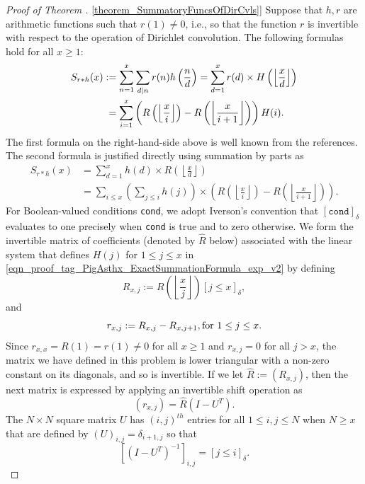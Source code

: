 \documentclass[11pt,reqno,a4letter]{article}
\newcommand{\hlocalref}[1]{\hyperref[#1]{\ref{#1}}}
\numberwithin{equation}{section}
\numberwithin{figure}{section}
\numberwithin{table}{section}
\newcommand{\Iverson}[1]{\ensuremath{\left[#1\right]_{\delta}}}
\newcommand{\floor}[1]{\left\lfloor #1 \right\rfloor}
\newcommand{\Floor}[2]{\ensuremath{\left\lfloor \frac{#1}{#2} \right\rfloor}}
\theoremstyle{plain}
\numberwithin{theorem}{section}
\theoremstyle{definition}
\theoremstyle{remark}
\newcommand{\mathtext}[1]{\text{\rm #1}}
\begin{document}
\begin{proof}[Proof of Theorem \hlocalref{theorem_SummatoryFuncsOfDirCvls}] 
\label{proofOf_theorem_SummatoryFuncsOfDirCvls} 
Suppose that $h,r$ are arithmetic functions such that $r(1) \neq 0$, i.e., so that 
the function $r$ is invertible with respect to the operation of Dirichlet convolution. 
The following formulas hold for all $x \geq 1$: 
\begin{align} 
\notag 
S_{r \ast h}(x) & := \sum_{n=1}^{x} \sum_{d|n} r(n) h\left(\frac{n}{d}\right) = 
     \sum_{d=1}^x r(d) \times H\left(\floor{\frac{x}{d}}\right) \\ 
\label{eqn_proof_tag_PigAsthx_ExactSummationFormula_exp_v2} 
     & \phantom{:} = 
     \sum_{i=1}^x \left(R\left(\floor{\frac{x}{i}}\right) - R\left(\floor{\frac{x}{i+1}}\right)\right) H(i). 
\end{align} 
The first formula on the right-hand-side above is well known from the references. 
The second formula is justified directly using 
summation by parts as \cite[\S 2.10(ii)]{NISTHB} 
\begin{align*} 
S_{r \ast h}(x) & = \sum_{d=1}^x h(d) \times R\left(\floor{\frac{x}{d}}\right) \\ 
     & = \sum_{i \leq x} \left(\sum_{j \leq i} h(j)\right) \times 
     \left(R\left(\floor{\frac{x}{i}}\right) - 
     R\left(\floor{\frac{x}{i+1}}\right)\right). 
\end{align*} 
For Boolean-valued conditions \texttt{cond}, we adopt Iverson's convention that 
$\Iverson{\mathtt{cond}}$ evaluates to one precisely when 
\texttt{cond} is true and to zero otherwise.
We form the invertible matrix of coefficients (denoted by $\hat{R}$ below) 
associated with the linear system that defines $H(j)$ for 
$1 \leq j \leq x$ in \eqref{eqn_proof_tag_PigAsthx_ExactSummationFormula_exp_v2} by defining
\[
R_{x,j} := R\left(\Floor{x}{j}\right) \Iverson{j \leq x}, 
\]
and 
\[
r_{x,j} := R_{x,j} - R_{x,j+1}, \mathtext{ for } 1 \leq j \leq x. 
\] 
Since $r_{x,x} = R(1) = r(1) \neq 0$ for all $x \geq 1$ and $r_{x,j} = 0$ for all $j > x$, 
the matrix we have defined in this problem is lower triangular with a non-zero 
constant on its diagonals, and so is invertible. 
If we let $\hat{R} := (R_{x,j})$, then the next matrix is 
expressed by applying an invertible shift operation as 
\[
(r_{x,j}) = \hat{R} \left(I - U^{T}\right). 
\]
The $N \times N$ square matrix $U$ 
has $(i,j)^{th}$ entries for all $1 \leq i,j \leq N$ when $N \geq x$ that are defined by 
$(U)_{i,j} = \delta_{i+1,j}$ so that 
\[
\left[\left(I - U^T\right)^{-1}\right]_{i,j} = \Iverson{j \leq i}. 
\]
\end{proof}
\end{document}
